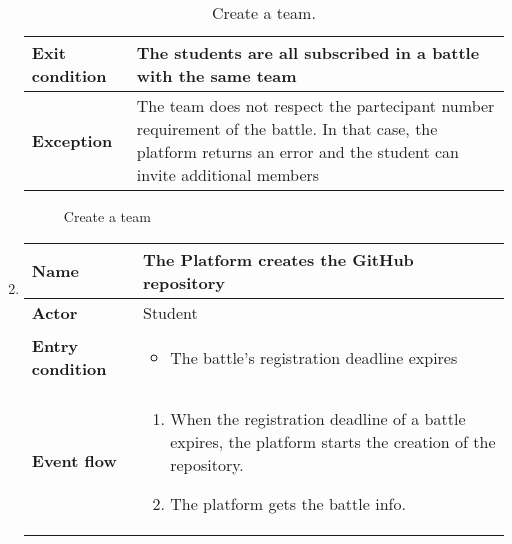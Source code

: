 \begin{enumerate}[label=\textbf{UC\arabic*}:,leftmargin=1.3cm]
\begin{table}[H]
\begin{tabular}{|l|p{11.9cm}|}
                        \textbf{Exit condition}  & The students are all subscribed in a battle with the same team              \\\hline
                        \textbf{Exception}       & The team does not respect the partecipant number requirement of the battle.
                        In that case, the platform returns an error and the student can invite additional members              \\\hline
                  \end{tabular}
                  \caption{Create a team.}
                  \label{table:Create a team}
            \end{table}
            \pagebreak

            \begin{figure}[H]
                  \centering
                  \caption{Create a team}
                  \label{fig:Create a team}
            \end{figure}
            \pagebreak
      \item \textbf{}
            \begin{table}[H]
                  \centering
                  \begin{tabular}{|l|p{11.9cm}|}
                        \hline
                        \textbf{Name}            & The Platform creates the GitHub repository                                        \\\hline
                        \textbf{Actor}           & Student                                                                           \\\hline
                        \textbf{Entry condition} &
                        \begin{itemize}
                              \item The battle's registration deadline expires
                        \end{itemize}                                                              \\\hline
                        \textbf{Event flow}      &
                        \begin{enumerate}[label=\arabic*.]
                              \item When the registration deadline of a battle expires, the platform starts the creation of the repository.
                              \item The platform gets the battle info.

\end{enumerate}
\end{tabular}
\end{table}
\end{enumerate}
